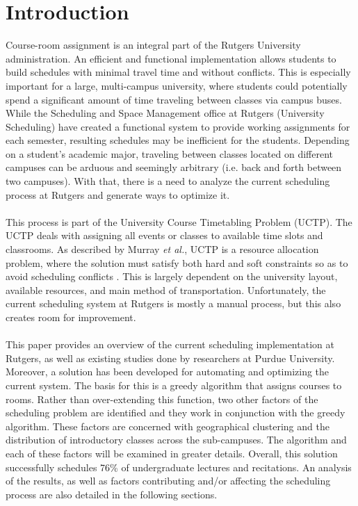 \documentclass[12pt]{article}
\begin{document}
\section{Introduction}
Course-room assignment is an integral part of the Rutgers University administration. An efficient and functional implementation allows students to build schedules with minimal travel time and without conflicts. This is especially important for a large, multi-campus university, where students could potentially spend a significant amount of time traveling between classes via campus buses. While the Scheduling and Space Management office at Rutgers (University Scheduling) have created a functional system to provide working assignments for each semester, resulting schedules may be inefficient for the students. Depending on a student's academic major, traveling between classes located on different campuses can be arduous and seemingly arbitrary (i.e. back and forth between two campuses). With that, there is a need to analyze the current scheduling process at Rutgers and generate ways to optimize it.
\\\\
This process is part of the University Course Timetabling Problem (UCTP). The UCTP deals with assigning all events or classes to available time slots and classrooms. As described by Murray \emph{et al.}, UCTP is a resource allocation problem, where the solution must satisfy both hard and soft constraints so as to avoid scheduling conflicts \cite{citation1}. This is largely dependent on the university layout, available resources, and main method of transportation. Unfortunately, the current scheduling system at Rutgers is mostly a manual process, but this also creates room for improvement. 
\\\\
This paper provides an overview of the current scheduling implementation at Rutgers, as well as existing studies done by researchers at Purdue University. Moreover, a solution has been developed for automating and optimizing the current system. The basis for this is a greedy algorithm that assigns courses to rooms. Rather than over-extending this function, two other factors of the scheduling problem are identified and they work in conjunction with the greedy algorithm. These factors are concerned with geographical clustering and the distribution of introductory classes across the sub-campuses. The algorithm and each of these factors will be examined in greater details. Overall, this solution successfully schedules 76\% of undergraduate lectures and recitations. An analysis of the results, as well as factors contributing and/or affecting the scheduling process are also detailed in the following sections.
\end{document}
